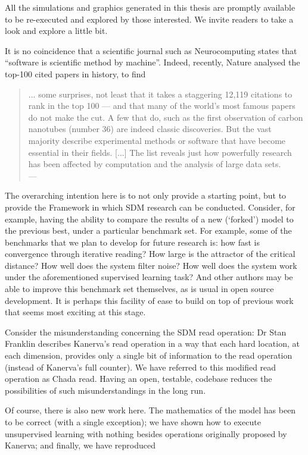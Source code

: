 All the simulations and graphics generated in this thesis are promptly available to be re-executed and explored by those interested. We invite readers to take a look and explore a little bit.

It is no coincidence that a scientific journal such as Neurocomputing states that “software is scientific method by machine”.  Indeed, recently, Nature analysed the top-100 cited papers in history, to find

\begin{quote}
... some surprises, not least that it takes a staggering 12,119 citations to rank in the top 100 — and that many of the world’s most famous papers do not make the cut. A few that do, such as the first observation of carbon nanotubes (number 36) are indeed classic discoveries. But the vast majority describe experimental methods or software that have become essential in their fields. [...] The list reveals just how powerfully research has been affected by computation and the analysis of large data sets. \\
\hfill --- \citet{van2014top}
\end{quote}


The overarching intention here is to not only provide a starting point, but to provide the Framework in which SDM research can be conducted.  Consider, for example, having the ability to compare the results of a new (‘forked’) model to the previous best, under a particular benchmark set.  For example, some of the benchmarks that we plan to develop for future research is: how fast is convergence through iterative reading?  How large is the attractor of the critical distance?  How well does the system filter noise?  How well does the system work under the aforementioned supervised learning task?  And other authors may be able to improve this benchmark set themselves, as is usual in open source development.  It is perhaps this facility of ease to build on top of previous work that seems most exciting at this stage.

Consider the misunderstanding concerning the SDM read operation:  Dr Stan Franklin describes Kanerva's read operation in a way that each hard location, at each dimension, provides only a single bit of information to the read operation (instead of Kanerva's full counter).  We have referred to this modified read operation as Chada read.  Having an open, testable, codebase reduces the possibilities of such misunderstandings in the long run.

Of course, there is also new work here.  The mathematics of the model has been to be correct (with a single exception); we have shown how to execute unsupervised learning with nothing besides operations originally proposed by Kanerva; and finally, we have reproduced


